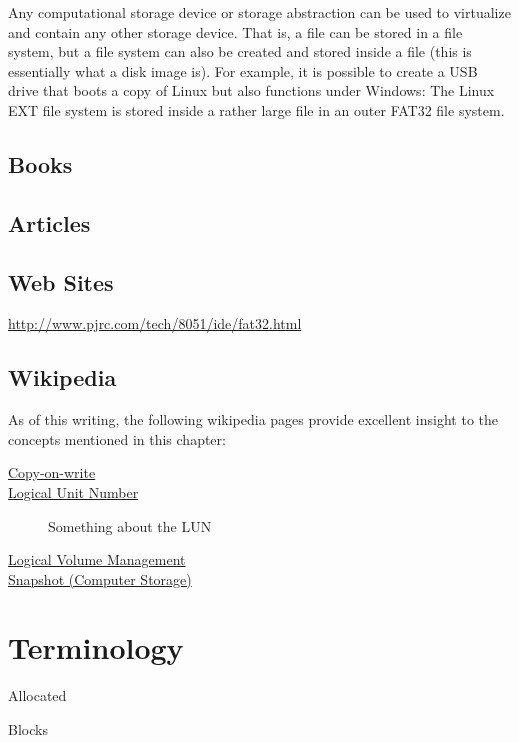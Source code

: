 Any computational storage device or storage abstraction can be used to
virtualize and contain any other storage device. That is, a file can
be stored in a file system, but a file system can also be created and
stored inside a file (this is essentially what a disk image is). For
example, it is possible to create a USB drive that boots a copy of
Linux but also functions under Windows: The Linux EXT file system is
stored inside a rather large file in an outer FAT32 file system.

\subsection{Books}
\subsection{Articles}
\subsection{Web Sites}
\url{http://www.pjrc.com/tech/8051/ide/fat32.html}
\subsection{Wikipedia}
As of this writing, the following wikipedia pages provide excellent
insight to the concepts mentioned in this chapter:

\begin{description}
\item[\href{http://en.wikipedia.org/wiki/Copy-on-write}{Copy-on-write}]
\item[\href{http://en.wikipedia.org/wiki/Logical_Unit_Number}{Logical
    Unit Number}] Something about the LUN
\item[\href{http://en.wikipedia.org/wiki/Logical_volume_management}{Logical
    Volume Management}]
\item[\href{http://en.wikipedia.org/wiki/Snapshot_(computer_storage)}{Snapshot
    (Computer Storage)}]
\end{description}

\section{Terminology}


Allocated

Blocks

